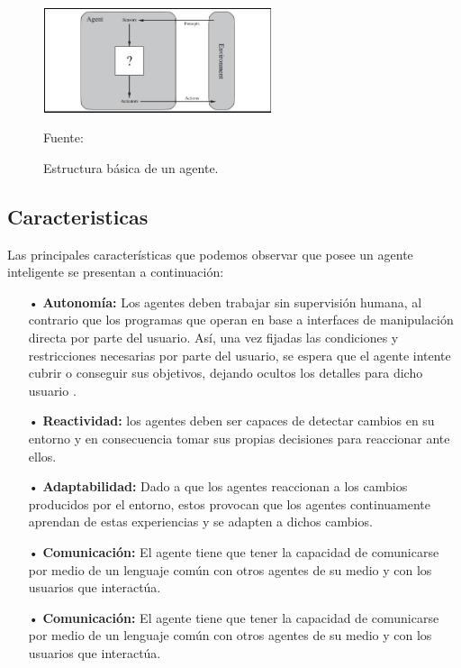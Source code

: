 \begin{figure}[ht]
\begin{center}
\includegraphics[width=0.6\textwidth]{Figura1}
\end{center}
\begin{center}
\vskip -0.5cm
\caption{\small{Estructura básica de un agente.}}
{\small{Fuente: \cite{Russel}}}
\end{center}
\end{figure}


\subsection{Caracteristicas}
Las principales características que podemos observar que  posee un agente inteligente se presentan a continuación:

\begin{enumerate}
\item[•] {\bf Autonomía:} Los agentes deben trabajar sin supervisión humana, al contrario que los programas que operan en base a interfaces de manipulación directa por parte del usuario. Así, una vez fijadas las condiciones y restricciones necesarias por parte del usuario, se espera que el agente intente cubrir o conseguir sus objetivos, dejando ocultos los detalles para dicho usuario \citep{Michael}.
\item[•] {\bf Reactividad:} los agentes deben ser capaces de detectar cambios en su entorno y en consecuencia tomar sus propias decisiones para reaccionar ante ellos.
\item[•] {\bf Adaptabilidad:} Dado a que los agentes reaccionan a los cambios producidos por el entorno, estos provocan que los agentes continuamente aprendan de estas experiencias y se adapten a dichos cambios.
\item[•] {\bf Comunicación:} El agente tiene que tener la capacidad de comunicarse por medio de un lenguaje común con otros agentes de su medio y con los usuarios que interactúa.

\item[•] {\bf Comunicación:} El agente tiene que tener la capacidad de comunicarse por medio de un lenguaje común con otros agentes de su medio y con los usuarios que interactúa.

\end{enumerate}


